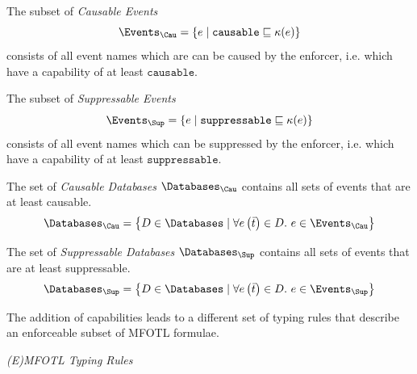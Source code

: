 \begin{definition}
    \label{def:cau-events}
    The subset of \emph{Causable Events}
    $$
    \Events_{\Cau} =
    \left\lbrace e \mid \texttt{causable} \sqsubseteq \kappa(e) \right\rbrace
    $$
    consists of all event names which are can be caused by the enforcer,
    i.e. which have a capability of at least $\texttt{causable}$.
\end{definition}

\begin{definition}
    \label{def:sup-events}
    The subset of \emph{Suppressable Events}
    $$
    \Events_{\Sup} =
    \left\lbrace e \mid \texttt{suppressable} \sqsubseteq \kappa(e) \right\rbrace
    $$
    consists of all event names which can be suppressed by the enforcer, 
    i.e. which have a capability of at least $\texttt{suppressable}$.
\end{definition}

\begin{definition}
    \label{def:cau-databases}
    The set of \emph{Causable Databases} $\Databases_\Cau$ contains all
    sets of events that are at least causable.
    $$
        \Databases_\Cau =
        \left\{
        D \in \Databases \mid
        \forall e\left( \bar{t} \right) \in D. \ e \in \Events_\Cau
        \right\}
    $$
\end{definition}

\begin{definition}
    \label{def:sup-databases}
    The set of \emph{Suppressable Databases} $\Databases_\Sup$ contains all sets
    of events that are at least suppressable.
    $$
        \Databases_\Sup =
        \left\{
        D \in \Databases \mid
        \forall e\left( \bar{t} \right) \in D. \ e \in \Events_\Sup
        \right\}
    $$
\end{definition}

The addition of capabilities leads to a different set of typing rules that
describe an enforceable subset of MFOTL formulae.

\begin{definition}
    \label{def:mfotl-typing-rules}
    \emph{(E)MFOTL Typing Rules} %
\end{definition}

